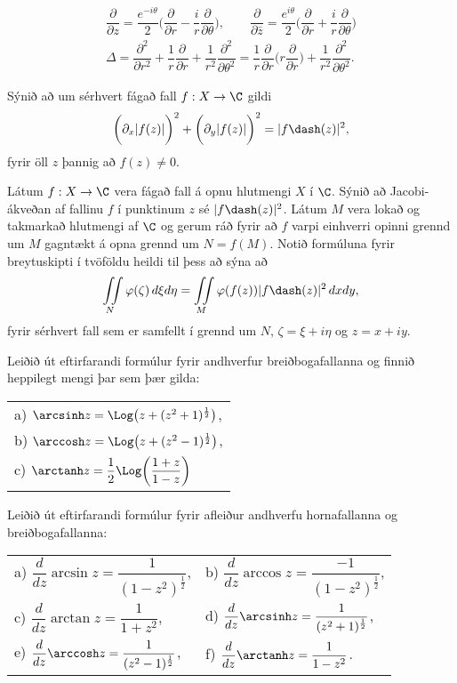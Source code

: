 \begin{gather*} 
\dfrac{\partial}{\partial z} =
\dfrac {e^{-i\theta}}2\bigg(\dfrac{\partial}{\partial r} -\dfrac ir
\dfrac{\partial}{\partial \theta}\bigg), \qquad
\dfrac{\partial}{\partial \bar z} =
\dfrac {e^{i\theta}}2\bigg(\dfrac{\partial}{\partial r} +\dfrac ir
\dfrac{\partial}{\partial \theta}\bigg)\\
\Delta
=\dfrac{\partial^2}{\partial r^2}+\dfrac 1r
\dfrac{\partial}{\partial r}
+\dfrac 1{r^2}\dfrac{\partial^2}{\partial\theta^2}
=\dfrac 1r\dfrac{\partial}{\partial r}\bigg(
r\dfrac{\partial}{\partial r}\bigg) +\dfrac 1{r^2}
\dfrac{\partial^2}{\partial \theta^2}.
\end{gather*}



\daemi Sýnið að um sérhvert fágað fall $f: X\to \C$ gildi
$$
\bigg( {\partial}_x|f(z)|\bigg)^2 +
\bigg( {\partial}_y|f(z)|\bigg)^2 = |f\dash(z)|^2, 
$$
fyrir  öll $z$ þannig að $f(z)\neq 0$.


\daemi Látum $f:X\to \C$ vera fágað fall á opnu hlutmengi $X$ í $\C$.
Sýnið að Jacobi-ákveðan af fallinu $f$ í punktinum $z$ sé
$|f\dash(z)|^2$.  Látum $M$ vera lokað og takmarkað hlutmengi af $\C$ og
gerum ráð fyrir að $f$ varpi einhverri opinni grennd um $M$ gagntækt á opna
grennd um $N=f(M)$.  Notið formúluna fyrir breytuskipti í tvöföldu
heildi til þess að sýna að 
$$
\iint\limits_{N}{\varphi}({\zeta})\, d{\xi}d{\eta}=
\iint\limits_{M}\varphi(f(z))|f\dash(z)|^2\, dxdy,
$$
fyrir sérhvert fall sem er samfellt í grennd um $N$, 
${\zeta}={\xi}+i{\eta}$ og $z=x+iy$.



\daemi Leiðið út eftirfarandi 
formúlur fyrir andhverfur breiðbogafallanna og finnið heppilegt mengi
þar sem þær gilda:

\smallskip
\begin{tabular}{l}
a) $\arcsinh z= \Log \big( z+(z^2+1)^{\frac 12}\big)$, \\
b) $\arccosh z= \Log \big( z+(z^2-1)^{\frac 12}\big)$,\\
c) $\arctanh z= \dfrac 12 \Log\bigg(\dfrac {1+z}{1-z}\bigg)$\\
\end{tabular}


\daemi Leiðið út eftirfarandi formúlur fyrir afleiður andhverfu
hornafallanna og  breiðbogafallanna:

\smallskip
\begin{tabular}{ll}
a) $\dfrac d{dz}\arcsin z= \dfrac 1{(1-z^2)^{\frac 12}}$,
&b) $\dfrac d{dz} \arccos z= \dfrac {-1}{(1-z^2)^{\frac 12}}$,\\
c) $\dfrac d{dz} \arctan z= \dfrac 1{1+z^2}$,
&d) $\dfrac d{dz}\arcsinh z= \dfrac 1{(z^2+1)^{\frac 12}}$,\\
e) $\dfrac d{dz} \arccosh z= \dfrac 1{(z^2-1)^{\frac 12}}$,
&f) $\dfrac d{dz} \arctanh z= \dfrac 1{1-z^2}$.\\ 
\end{tabular}


